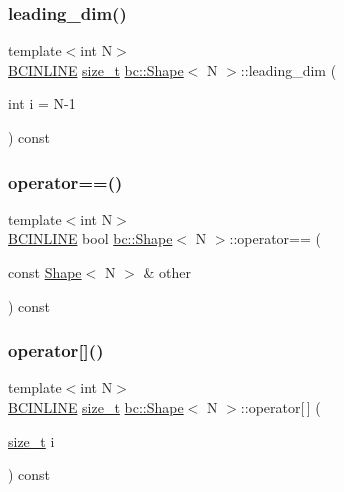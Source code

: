 \subsubsection{\texorpdfstring{leading\+\_\+dim()}{leading\_dim()}}
{\footnotesize\ttfamily template$<$int N$>$ \\
\hyperlink{common_8h_a6699e8b0449da5c0fafb878e59c1d4b1}{B\+C\+I\+N\+L\+I\+NE} \hyperlink{structbc_1_1Shape_a63f974ebdb0e3755ef3140b17abcf235}{size\+\_\+t} \hyperlink{structbc_1_1Shape}{bc\+::\+Shape}$<$ N $>$\+::leading\+\_\+dim (\begin{DoxyParamCaption}\item[{int}]{i = {\ttfamily N-\/1} }\end{DoxyParamCaption}) const\hspace{0.3cm}{\ttfamily [inline]}}

\mbox{\label{structbc_1_1Shape_a378fc6e7baaa057cee70a0b691e194a6}} 
\subsubsection{\texorpdfstring{operator==()}{operator==()}}
{\footnotesize\ttfamily template$<$int N$>$ \\
\hyperlink{common_8h_a6699e8b0449da5c0fafb878e59c1d4b1}{B\+C\+I\+N\+L\+I\+NE} bool \hyperlink{structbc_1_1Shape}{bc\+::\+Shape}$<$ N $>$\+::operator== (\begin{DoxyParamCaption}\item[{const \hyperlink{structbc_1_1Shape}{Shape}$<$ N $>$ \&}]{other }\end{DoxyParamCaption}) const\hspace{0.3cm}{\ttfamily [inline]}}

\mbox{\label{structbc_1_1Shape_a3843811a9a21dfc515d156f7482c2db0}} 
\subsubsection{\texorpdfstring{operator[]()}{operator[]()}}
{\footnotesize\ttfamily template$<$int N$>$ \\
\hyperlink{common_8h_a6699e8b0449da5c0fafb878e59c1d4b1}{B\+C\+I\+N\+L\+I\+NE} \hyperlink{structbc_1_1Shape_a63f974ebdb0e3755ef3140b17abcf235}{size\+\_\+t} \hyperlink{structbc_1_1Shape}{bc\+::\+Shape}$<$ N $>$\+::operator\mbox{[}$\,$\mbox{]} (\begin{DoxyParamCaption}\item[{\hyperlink{structbc_1_1Shape_a63f974ebdb0e3755ef3140b17abcf235}{size\+\_\+t}}]{i }\end{DoxyParamCaption}) const\hspace{0.3cm}{\ttfamily [inline]}}

